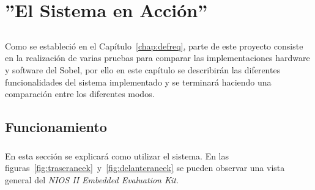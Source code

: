 \documentclass[a4paper,12pt,titlepage,final]{book}
\begin{document}
\chapter{''El Sistema en Acción''}
\section*{}
\subsection*{}
\subsubsection*{}

\paragraph{}
Como se estableció en el Capítulo~\ref{chap:defreq}, parte de este proyecto consiste en la realización de varias pruebas para comparar las implementaciones hardware y software del Sobel, por ello en este capítulo se describirán las diferentes funcionalidades del sistema implementado y se terminará haciendo una comparación entre los diferentes modos.

\clearpage
\section{Funcionamiento}
\subsection*{}
\subsubsection*{}
\paragraph{}
En esta sección se explicará como utilizar el sistema. En las figuras~\ref{fig:traseraneek}~y~\ref{fig:delanteraneek} se pueden observar una vista general del \textit{NIOS II Embedded Evaluation Kit}.
\end{document}
